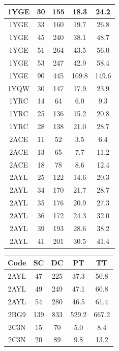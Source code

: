 \begin{table}
\begin{tabular}{||c |c c c c||}
        \hline
        1YGE & 30 & 155 & 18.3 & 24.2 \\
        \hline
        1YGE & 33 & 160 & 19.7 & 26.8 \\
        \hline
        1YGE & 45 & 240 & 38.1 & 48.7 \\
        \hline
        1YGE & 51 & 264 & 43.5 & 56.0 \\
        \hline
        1YGE & 53 & 247 & 42.9 & 58.4 \\
        \hline
        1YGE & 90 & 445 & 109.8 & 149.6 \\
        \hline
        1YQW & 30 & 147 & 17.9 & 23.9 \\
        \hline
        1YRC & 14 & 64 & 6.0 & 9.3 \\
        \hline
        1YRC & 25 & 136 & 15.2 & 20.8 \\
        \hline
        1YRC & 28 & 138 & 21.0 & 28.7 \\
        \hline
        2ACE & 11 & 52 & 3.5 & 6.4 \\
        \hline
        2ACE & 13 & 65 & 7.7 & 11.2 \\
        \hline
        2ACE & 18 & 78 & 8.6 & 12.4 \\
        \hline
        2AYL & 25 & 122 & 14.6 & 20.3 \\
        \hline
        2AYL & 34 & 170 & 21.7 & 28.7 \\
        \hline
        2AYL & 35 & 176 & 20.9 & 27.3 \\
        \hline
        2AYL & 36 & 172 & 24.3 & 32.0 \\
        \hline
        2AYL & 39 & 193 & 28.6 & 38.2 \\
        \hline
        2AYL & 41 & 201 & 30.5 & 41.4 \\
        \hline
    \end{tabular}
    \hfill
    \begin{tabular}{||c | c c c c||}
        \hline
        Code & SC & DC & PT & TT \\ [0.5ex]
        \hline\hline
        2AYL & 47 & 225 & 37.3 & 50.8 \\
        \hline
        2AYL & 49 & 249 & 47.1 & 60.8 \\
        \hline
        2AYL & 54 & 280 & 46.5 & 61.4 \\
        \hline
        2BG9 & 139 & 833 & 529.2 & 667.2 \\
        \hline
        2C3N & 15 & 70 & 5.0 & 8.4 \\
        \hline
        2C3N & 20 & 89 & 9.8 & 13.2 \\

\end{tabular}
\end{table}
